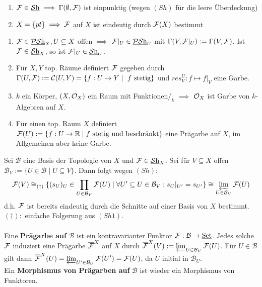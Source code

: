 \begin{rem}
\label{rem:pathologien-garben}
\begin{enumerate}
	\item $\mathcal{F} \in \operatorname{\underline{\mathcal{S}h}} \implies \Gamma(\emptyset, \mathcal{F})$ ist einpunktig (wegen $(Sh)$ für die leere Überdeckung)
	\item $X = \{ pt \} \implies \mathcal{F}$ auf $X$ ist eindeutig durch $\mathcal{F}(X)$ bestimmt
\end{enumerate}
\end{rem}


\begin{example}
\label{bsp:beispiele-von-garben}	
\begin{enumerate}
	\item $\mathcal{F} \in \operatorname{\underline{\mathcal{PS}h}}_{X}, U \subseteq X$ offen $\implies$ $\mathcal{F}|_{U} \in \operatorname{\underline{\mathcal{PS}h}}_{U}$ mit $\Gamma(V, \mathcal{F}|_{U}) := \Gamma(V, \mathcal{F})$. Ist $\mathcal{F} \in \operatorname{\underline{\mathcal{S}h}}_{X}$, so ist $\mathcal{F}|_{U} \in \operatorname{\underline{\mathcal{S}h}}_{U}$. 
	\item Für $X,Y$ top. Räume definiert $\mathcal{F}$ gegeben durch $\Gamma(U, \mathcal{F}) := \mathcal{C}(U, Y) = \{ f : U \to Y \mid \ f \text{ stetig}\}$ und $res^{U}_{V} : f \mapsto f|_{V}$ eine Garbe.
	\item $k$ ein Körper, $(X,\mathcal{O}_X)$ ein Raum mit Funktionen$/_k$ $\implies$ $\mathcal{O}_{X}$ ist Garbe von $k$-Algebren auf $X$.
	\item Für einen top. Raum $X$ definiert $\mathcal{F}(U) := \{ f: U \to \mathbb R \mid f \text{ stetig und beschränkt}\}$ eine Prägarbe auf $X$, im Allgemeinen aber keine Garbe.
\end{enumerate}
\end{example}

Sei $\mathcal{B}$ eine Basis der Topologie von $X$ und $\mathcal{F} \in \operatorname{\underline{\mathcal{S}h}}_{X}$. Sei für $V \subseteq X$ offen $\mathcal{B}_{V} := \{ U \in \mathcal{B} \mid U \subseteq V\}$. Dann folgt wegen $(Sh)$:\\
\[
\mathcal{F}(V) \cong_{(\dagger)} \{ (s_{U})_{U} \in \prod_{U \in \mathcal{B}_{V}} \mathcal{F}(U) \mid \forall U' \subseteq U \in \mathcal{B}_{V}: s_{U}|_{U'} = s_{U'}\} \cong \varprojlim_{U \in \mathcal{B}_{V}} \mathcal{F}(U)
\]d.h. $\mathcal{F}$ ist bereits eindeutig durch die Schnitte auf einer Basis von $X$ bestimmt.\\
$(\dagger):$ einfache Folgerung aus $(Sh1)$.\\
\\
Eine \textbf{Prägarbe auf } $\mathcal{B}$ ist ein kontravarianter Funktor $\mathcal{F} : \mathcal{B} \to \operatorname{\underline{Set}}$. Jedes solche $\mathcal{F}$ induziert eine Prägarbe $\overline{\mathcal{F}}^{X}$ auf $X$ durch $\overline{\mathcal{F}}^{X}(V) := \varprojlim_{U \in \mathcal{B}_{V}} \mathcal{F}(U)$.
Für $U \in \mathcal{B}$ gilt dann $\overline{\mathcal{F}}^{X}(U) = \varprojlim_{U' \in \mathcal{B}_{U}}\mathcal{F}(U') = \mathcal{F}(U)$, da $U$ initial in $\mathcal{B}_{U}$.\\ Ein \textbf{Morphismus von Prägarben auf } $\mathcal{B}$ ist wieder ein Morphismus von Funktoren.


